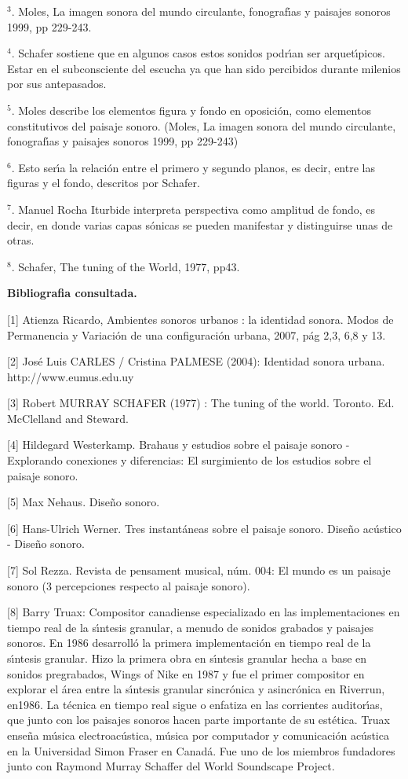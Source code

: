 $^{3}$. Moles, La imagen sonora del mundo circulante, fonograf\'{\i}as y
paisajes sonoros 1999, pp 229-243.

$^{4}$. Schafer sostiene que en algunos casos estos sonidos podr\'{\i}an ser
arquet\'{\i}picos. Estar en el subconsciente del escucha ya que han sido
percibidos durante milenios por sus antepasados.

$^{5}$. Moles describe los elementos figura y fondo en oposici\'{o}n, como
elementos constitutivos del paisaje sonoro. (Moles, La imagen sonora del mundo
circulante, fonograf\'{\i}as y paisajes sonoros 1999, pp 229-243)

$^{6}$. Esto ser\'{\i}a la relaci\'{o}n entre el primero y segundo planos, es
decir, entre las figuras y el fondo, descritos por Schafer.

$^{7}$. Manuel Rocha Iturbide interpreta perspectiva como amplitud de fondo,
es decir, en donde varias capas s\'{o}nicas se pueden manifestar y
distinguirse unas de otras.

$^{8}$. Schafer, The tuning of the World, 1977, pp43.

\textbf{Bibliografia consultada.}

[1] Atienza Ricardo, Ambientes sonoros urbanos : la identidad sonora. Modos de
Permanencia y Variaci\'{o}n de una configuraci\'{o}n urbana, 2007, p\'{a}g
2,3, 6,8 y 13.

[2] Jos\'{e} Luis CARLES / Cristina PALMESE (2004): Identidad sonora urbana. http://www.eumus.edu.uy

[3] Robert MURRAY SCHAFER (1977) : The tuning of the world. Toronto. Ed.
McClelland and Steward.

[4] Hildegard Westerkamp. Brahaus y estudios sobre el paisaje sonoro -
Explorando conexiones y diferencias: El surgimiento de los estudios sobre el
paisaje sonoro.

[5] Max Nehaus. Dise\~{n}o sonoro.

[6] Hans-Ulrich Werner. Tres instant\'{a}neas sobre el paisaje sonoro.
Dise\~{n}o ac\'{u}stico - Dise\~{n}o sonoro.

[7] Sol Rezza. Revista de pensament musical, n\'{u}m. 004: El mundo es un
paisaje sonoro (3 percepciones respecto al paisaje sonoro).

[8] Barry Truax: Compositor canadiense especializado en las implementaciones
en tiempo real de la s\'{\i}ntesis granular, a menudo de sonidos grabados y
paisajes sonoros. En 1986 desarroll\'{o} la primera implementaci\'{o}n en
tiempo real de la s\'{\i}ntesis granular. Hizo la primera obra en
s\'{\i}ntesis granular hecha a base en sonidos pregrabados, Wings of Nike en
1987 y fue el primer compositor en explorar el \'{a}rea entre la s\'{\i}ntesis
granular sincr\'{o}nica y asincr\'{o}nica en Riverrun, en1986. La t\'{e}cnica
en tiempo real sigue o enfatiza en las corrientes auditor\'{\i}as, que junto
con los paisajes sonoros hacen parte importante de su est\'{e}tica. Truax
ense\~{n}a m\'{u}sica electroac\'{u}stica, m\'{u}sica por computador y
comunicaci\'{o}n ac\'{u}stica en la Universidad Simon Fraser en Canad\'{a}.
Fue uno de los miembros fundadores junto con Raymond Murray Schaffer del World
Soundscape Project.

